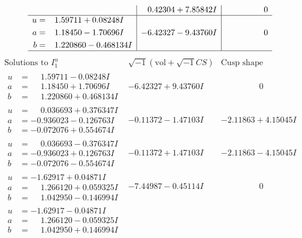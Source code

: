\documentclass[1p]{elsarticle_modified}
\theoremstyle{definition}
\newcommand{\I}{\sqrt{-1}}
\begin{document}
$$\begin{array}{c|c|c}
 & \phantom{-}0.42304 + 7.85842 I & \phantom{-0.000000 } 0 \\ \hline\begin{aligned}
u &= \phantom{-}1.59711 + 0.08248 I \\
a &= \phantom{-}1.18450 - 1.70696 I \\
b &= \phantom{-}1.220860 - 0.468134 I\end{aligned}
 & -6.42327 - 9.43760 I & \phantom{-0.000000 } 0\\
 \hline 
 \end{array}$$\newpage$$\begin{array}{c|c|c}  
\text{Solutions to }I^u_{1}& \I (\text{vol} + \sqrt{-1}CS) & \text{Cusp shape}\\
 \hline 
\begin{aligned}
u &= \phantom{-}1.59711 - 0.08248 I \\
a &= \phantom{-}1.18450 + 1.70696 I \\
b &= \phantom{-}1.220860 + 0.468134 I\end{aligned}
 & -6.42327 + 9.43760 I & \phantom{-0.000000 } 0 \\ \hline\begin{aligned}
u &= \phantom{-}0.036693 + 0.376347 I \\
a &= -0.936023 - 0.126763 I \\
b &= -0.072076 + 0.554674 I\end{aligned}
 & -0.11372 - 1.47103 I & -2.11863 + 4.15045 I \\ \hline\begin{aligned}
u &= \phantom{-}0.036693 - 0.376347 I \\
a &= -0.936023 + 0.126763 I \\
b &= -0.072076 - 0.554674 I\end{aligned}
 & -0.11372 + 1.47103 I & -2.11863 - 4.15045 I \\ \hline\begin{aligned}
u &= -1.62917 + 0.04871 I \\
a &= \phantom{-}1.266120 + 0.059325 I \\
b &= \phantom{-}1.042950 - 0.146994 I\end{aligned}
 & -7.44987 - 0.45114 I & \phantom{-0.000000 } 0 \\ \hline\begin{aligned}
u &= -1.62917 - 0.04871 I \\
a &= \phantom{-}1.266120 - 0.059325 I \\
b &= \phantom{-}1.042950 + 0.146994 I\end{aligned}

\end{array}$$
\end{document}

